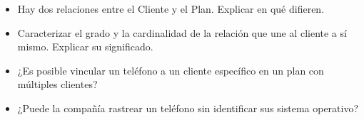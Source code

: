 \documentclass[letterpaper,11pt]{article}
\begin{document}
\begin{itemize}
    \item Hay dos relaciones entre el Cliente y el Plan. Explicar en qué 
    difieren.

    \item Caracterizar el grado y la cardinalidad de la relación que une al 
    cliente a sí mismo. Explicar su significado.

    \item ¿Es posible vincular un teléfono a un cliente específico en un plan 
    con múltiples clientes?

    \item ¿Puede la compañía rastrear un teléfono sin identificar sus sistema 
    operativo?

\end{itemize}
\end{document}
